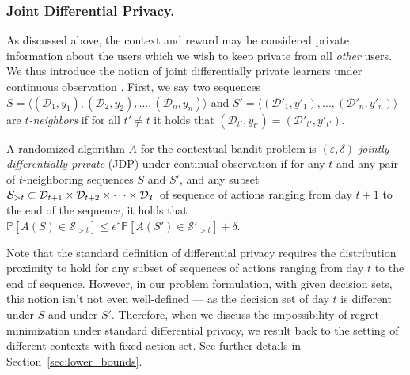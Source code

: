 \documentclass{article}
\newcommand{\os}[1]{\textcolor{red}{Or's comment:~\textbf{#1}}}
\renewcommand{\Pr}{\mathds{P}}
\begin{document}
\subsubsection{Joint Differential Privacy.}\label{sec:joint-dp}

As discussed above, the context and reward may be considered private
information about the users which we wish to keep private from all \emph{other} users. We thus introduce the notion of joint differentially private learners under continuous observation \citep[a combination of the two definitions given in][]{KearnsMechanismDesign2014,DworkContinualObservation2010}. First, we say two sequences $S = \langle (\mathcal{D}_1, y_1), (\mathcal{D}_2, y_2), ..., (\mathcal{D}_n, y_n) \rangle$ and $S' = \langle (\mathcal{D}'_1, y'_1), ..., (\mathcal{D}'_n, y'_n) \rangle$ are \emph{$t$-neighbors} if for all $t'\neq t$ it holds that $(\mathcal{D}_{t'},y_{t'}) = (\mathcal{D}'_{t'}, y'_{t'})$.

\begin{definition}
\label{def:joint-dp}
  A randomized algorithm $A$ for the contextual bandit problem is
  \emph{$(\varepsilon,\delta)$-jointly differentially private} (JDP) under continual observation if for any $t$ and any pair of $t$-neighboring sequences $S$ and $S'$, and any subset ${\cal S}_{>t} \subset \mathcal{D}_{t+1} \times \mathcal{D}_{t+2} \times \cdots \times \mathcal{D}_{T}$ of sequence of actions ranging from day $t+1$ to the end of the sequence, it holds that $\Pr[A(S)\in \mathcal{S}_{>t}] \leq e^\varepsilon\Pr[A(S')\in \mathcal{S}'_{>t}] +\delta$.
\end{definition}
Note that the standard definition of differential privacy requires the distribution proximity to hold for any subset of sequences of actions ranging from day $t$ to the end of sequence. However, in our problem formulation, with given decision sets, this notion isn't not even well-defined --- as the decision set of day $t$ is different under $S$ and under $S'$. Therefore, when we discuss the impossibility of regret-minimization under standard differential privacy, we result back to the setting of different contexts with fixed action set. See further details in Section~\ref{sec:lower_bounds}.
\end{document}
